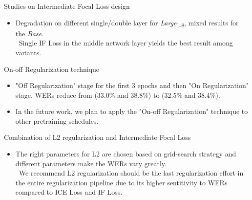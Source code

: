 \begin{frame}{Studies on Intermediate Focal Loss design}

\begin{itemize}
    \item Degradation on different single/double layer for \textit{Large}\textsubscript{1-8}, mixed results for the \textit{Base}.
    \\ \textrightarrow \,
    Single IF Loss in the middle network layer yields the best result among variants.
\end{itemize}
\end{frame}


\begin{frame}{On-off Regularization technique}

\begin{itemize}
    \item "Off Regularization" stage for the first 3 epochs and then "On Regularization" stage, WERs reduce from (33.0\% and 38.8\%) to (32.5\% and 38.4\%).
    \item In the future work, we plan to apply the "On-off Regularization" technique to other pretraining schedules.
\end{itemize}
\end{frame}


\begin{frame}{Combination of L2 regularization and Intermediate Focal Loss}

\begin{itemize}
    \item The right parameters for L2 are chosen based on grid-search strategy and different parameters make the WERs vary greatly.
    \\ \textrightarrow \,
    We recommend L2 regularization should be the last regularization effort in the entire regularization pipeline due to its higher sentitivity to WERs compared to ICE Loss and IF Loss. 
\end{itemize}
\end{frame}